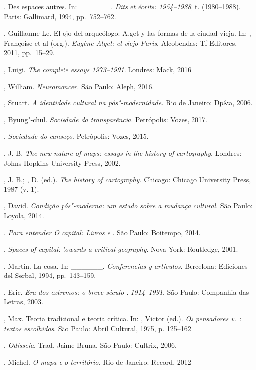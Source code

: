 \begin{bibliohedra}
\tit{\_\_\_\_\_\_}. Des espaces autres. In: \_\_\_\_\_\_. \emph{Dits
et écrits: 1954--1988}, t.  (1980--1988). Paris: Gallimard, 1994, pp.~752--762.

, Guillaume Le. El ojo del arqueólogo: Atget y las formas de la
ciudad vieja. In: , Françoise et al (org.). \emph{Eugène
Atget: el viejo Paris}. Alcobendas: Tf Editores, 2011, pp.~15--29.

, Luigi. \emph{The complete essays 1973--1991}. Londres: Mack,
2016.

, William. \emph{Neuromancer.} São Paulo: Aleph, 2016.

, Stuart. \emph{A identidade cultural na pós"-modernidade.} Rio de
Janeiro: Dp\&a, 2006.

, Byung"-chul. \emph{Sociedade da transparência}. Petrópolis: Vozes, 2017.

\tit{\_\_\_\_\_\_}. \emph{Sociedade do cansaço}. Petrópolis: Vozes, 2015.

, J. B. \emph{The new nature of maps: essays in the history of
cartography}. Londres: Johns Hopkins University Press, 2002.

, J. B.; , D. (ed.). \emph{The history of cartography.}
Chicago: Chicago University Press, 1987 (v. 1).

, David. \emph{Condição pós"-moderna: um estudo sobre a mudança
cultural}. São Paulo: Loyola, 2014.

\tit{\_\_\_\_\_\_}. \emph{Para entender \emph{O capital}: Livros}  \emph{e}
. São Paulo: Boitempo, 2014.

\tit{\_\_\_\_\_\_}. \emph{Spaces of capital: towards a critical
geography}. Nova York: Routledge, 2001.

, Martin. La cosa. In: \_\_\_\_\_\_. \emph{Conferencias y
artículos.} Bercelona: Ediciones del Serbal, 1994, pp.~143--159.

, Eric. \emph{Era dos extremos: o breve século : 1914--1991}.
São Paulo: Companhia das Letras, 2003.

, Max. Teoria tradicional e teoria crítica. In: , Victor (ed.). \emph{Os pensadores v.}~: \emph{textos escolhidos}. São Paulo: Abril Cultural, 1975, p. 125--162.

. \emph{Odisseia}. Trad. Jaime Bruna. São Paulo: Cultrix, 2006.

, Michel. \emph{O mapa e o território.} Rio de Janeiro:
Record, 2012.


\end{bibliohedra}

